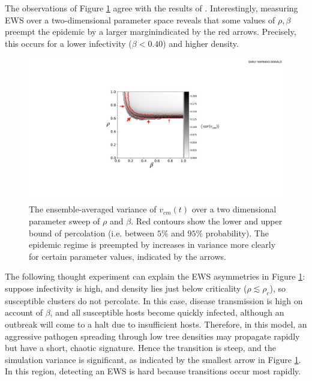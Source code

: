 The observations of Figure \ref{fig:ews-results} agree with the results of \cite{OROZCOFUENTES201912}. 
Interestingly, measuring EWS over a two-dimensional parameter space reveals that some values 
of $\rho, \beta$ preempt the epidemic by a larger margin\textemdash indicated by the red 
arrows. 
Precisely, this occurs for a lower infectivity 
($\beta<0.40$) and higher density. 

\newpage

 \begin{figure}
    \centering
    \includegraphics[scale=0.45]{chapter3/figures/figure11.pdf}
    \caption{The ensemble-averaged variance of $v_{cm}(t)$ over a two dimensional parameter sweep of $\rho$ and $\beta$. Red contours show the lower and upper bound of percolation (i.e. between $5\%$ and $95\%$ probability). 
     The epidemic regime is preempted by increases in variance more clearly for certain parameter values, %
     indicated by the arrows.}
    \label{fig:ews-results} 
\end{figure}

The following thought experiment can explain the EWS asymmetries in Figure \ref{fig:ews-results}: %
suppose infectivity is high, and density lies just below criticality ($\rho\lesssim\rho_c$), 
so susceptible clusters do not percolate. 
In this case, disease transmission is high on account of $\beta$, 
and all susceptible hosts become quickly infected, 
although an outbreak will come to a halt due to insufficient hosts. Therefore, in this model, 
an aggressive pathogen spreading through low tree densities may propagate rapidly but have a short, 
chaotic signature. Hence the transition is steep,
and the simulation variance is significant, as indicated by the smallest arrow in Figure \ref{fig:ews-results}. 
In this region, detecting an EWS is hard because transitions occur most rapidly.

